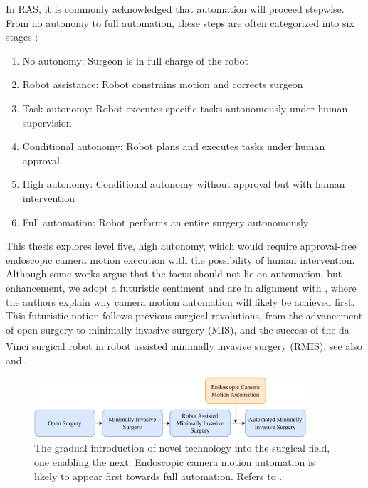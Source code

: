 In RAS, it is commonly acknowledged that automation will proceed stepwise. From no autonomy to full automation, these steps are often categorized into six stages \cite{zhang2017automation, fosch2021human}:
\begin{enumerate}
    \item No autonomy: Surgeon is in full charge of the robot
    \item Robot assistance: Robot constrains motion and corrects surgeon  
    \item Task autonomy: Robot executes specific tasks autonomously under human supervision
    \item Conditional autonomy: Robot plans and executes tasks under human approval
    \item High autonomy: Conditional autonomy without approval but with human intervention
    \item Full automation: Robot performs an entire surgery autonomously
\end{enumerate}
This thesis explores level five, high autonomy, which would require approval-free endoscopic camera motion execution with the possibility of human intervention. Although some works \cite{battaglia2021rethinking} argue that the focus should not lie on automation, but enhancement, we adopt a futuristic sentiment and are in alignment with \cite{kitaguchi2022artificial}, where the authors explain why camera motion automation will likely be achieved first. This futuristic notion follows previous surgical revolutions, from the advancement of open surgery to minimally invasive surgery (MIS), and the success of the da Vinci\textsuperscript{\textregistered} surgical robot in robot assisted minimally invasive surgery (RMIS), see also  and .
\begin{figure}[b]
    \centering
    \includegraphics[width=0.9\textwidth]{introduction/fig/24_02_13_surgical_revolution.pdf}
    \caption{The gradual introduction of novel technology into the surgical field, one enabling the next. Endoscopic camera motion automation is likely to appear first towards full automation. Refers to .}
    \label{in:fig:camera_motion_automation}
\end{figure}


